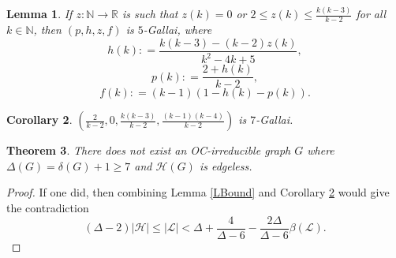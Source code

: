 \documentclass[12pt]{article}
\theoremstyle{plain}
\newtheorem{thm}{Theorem}
\newtheorem{lem}[thm]{Lemma}
\newtheorem{cor}[thm]{Corollary}
\theoremstyle{definition}
\theoremstyle{remark}
\newcommand{\fancy}[1]{\mathcal{#1}}
\newcommand{\IN}{\mathbb{N}}
\newcommand{\IR}{\mathbb{R}}
\renewcommand{\L}{\fancy{L}}
\newcommand{\HH}{\fancy{H}}
\newcommand{\card}[1]{\left|#1\right|}
\newcommand{\func}[3]{#1\colon #2 \rightarrow #3}
\newcommand{\parens}[1]{\left( #1 \right)}
\newcommand{\DefinedAs}{\mathrel{\mathop:}=}
\begin{document}
\begin{lem}
If $\func{z}{\IN}{\IR}$ is such that $z(k) = 0$ or $2 \le z(k) \le \frac{k(k-3)}{k-2}$  for all $k \in \IN$, then 
$(p,h,z,f)$ is $5$-Gallai, where
\[h(k) \DefinedAs \frac{k(k-3) - (k-2)z(k)}{k^2-4k+5},\]
\[p(k) \DefinedAs \frac{2 + h(k)}{k-2},\]
\[f(k) \DefinedAs (k-1)(1 - h(k) - p(k)).\]
\end{lem}

\begin{cor}\label{GBound}
$\parens{\frac{2}{k-2}, 0, \frac{k(k-3)}{k-2}, \frac{(k-1)(k-4)}{k-2}}$ is $7$-Gallai.
\end{cor}

\begin{thm}\label{LBoundT}
There does not exist an OC-irreducible graph $G$ where $\Delta(G) = \delta(G) + 1 \ge 7$ and $\HH(G)$ is edgeless.
\end{thm}
\begin{proof}
If one did, then combining Lemma \ref{LBound} and Corollary \ref{GBound} would give the contradiction
\[(\Delta-2)\card{\HH} \le \card{\L} < \Delta + \frac{4}{\Delta-6} - \frac{2\Delta}{\Delta-6}\beta(\L).\]
\end{proof}
\end{document}
